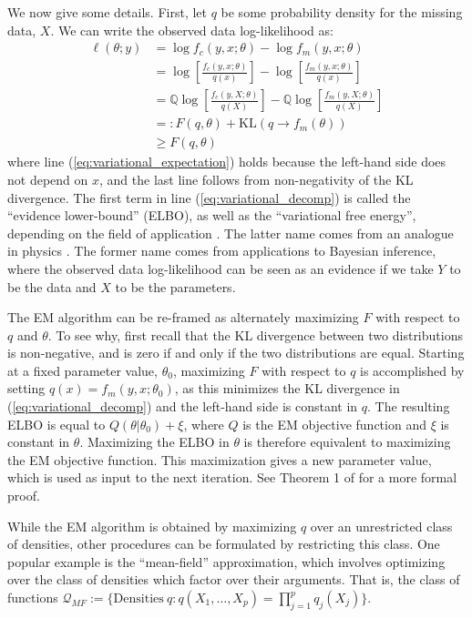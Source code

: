\documentclass[11pt, oneside]{article}   	%
\newcommand{\bQ}{\mathbb{Q}}
\begin{document}
We now give some details. First, let $q$ be some probability density for the missing data, $X$. We can write the observed data log-likelihood as:
%
\begin{align}
    \ell(\theta; y) &= \log f_c(y, x; \theta) - \log f_m(y, x; \theta)\\
    &= \log \left[ \frac{f_c(y, x; \theta)}{q(x)} \right] - \log \left[ \frac{f_m(y, x; \theta)}{q(x)} \right]\\
    &= \bQ \log \left[ \frac{f_c(y, X; \theta)}{q(X)} \right] - \bQ \log \left[ \frac{f_m(y, X; \theta)}{q(X)} \right] \label{eq:variational_expectation}\\
    &=: F(q, \theta) + \mathrm{KL}(q \rightarrow f_m(\theta)) \label{eq:variational_decomp}\\
    & \geq F(q, \theta)
\end{align}
%
where line (\ref{eq:variational_expectation}) holds because the left-hand side does not depend on $x$, and the last line follows from non-negativity of the KL divergence. The first term in line (\ref{eq:variational_decomp}) is called the ``evidence lower-bound'' (ELBO), as well as the ``variational free energy'', depending on the field of application \citep{need}. The latter name comes from an analogue in physics \citep{need}. The former name comes from applications to Bayesian inference, where the observed data log-likelihood can be seen as an evidence if we take $Y$ to be the data and $X$ to be the parameters. 

The EM algorithm can be re-framed as alternately maximizing $F$ with respect to $q$ and $\theta$. To see why, first recall that the KL divergence between two distributions is non-negative, and is zero if and only if the two distributions are equal. Starting at a fixed parameter value, $\theta_0$, maximizing $F$ with respect to $q$ is accomplished by setting $q(x) = f_m(y, x; \theta_0)$, as this minimizes the KL divergence in (\ref{eq:variational_decomp}) and the left-hand side is constant in $q$. The resulting ELBO is equal to $Q(\theta|\theta_0) + \xi$, where $Q$ is the EM objective function and $\xi$ is constant in $\theta$. Maximizing the ELBO in $\theta$ is therefore equivalent to maximizing the EM objective function. This maximization gives a new parameter value, which is used as input to the next iteration. See Theorem 1 of \citet{Nea98} for a more formal proof.

While the EM algorithm is obtained by maximizing $q$ over an unrestricted class of densities, other procedures can be formulated by restricting this class. One popular example is the ``mean-field'' approximation, which involves optimizing over the class of densities which factor over their arguments. That is, the class of functions $\mathcal{Q}_{MF}:=\{ \mathrm{Densities\ } q: q(X_1, \ldots, X_p) = \prod_{j=1}^p q_j(X_j) \}$. 
\end{document}
